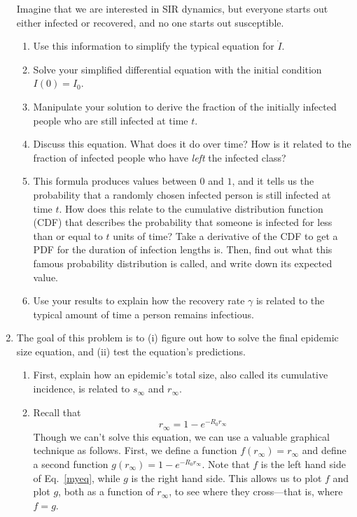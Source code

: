 \documentclass[11pt]{article}
\begin{document}
\begin{enumerate}
	Imagine that we are interested in SIR dynamics, but everyone starts out either infected or recovered, and no one starts out susceptible.
	\begin{enumerate}[label=\alph*.]
		\item Use this information to simplify the typical equation for $\dot{I}$.
		\item Solve your simplified differential equation with the initial condition $I(0) = I_0$.
		\item Manipulate your solution to derive the fraction of the initially infected people who are still infected at time $t$.
		\item Discuss this equation. What does it do over time? How is it related to the fraction of infected people who have {\it left} the infected class?
		\item This formula produces values between $0$ and $1$, and it tells us the probability that a randomly chosen infected person is still infected at time $t$. How does this relate to the cumulative distribution function (CDF) that describes the probability that someone is infected for less than or equal to $t$ units of time? Take a derivative of the CDF to get a PDF for the duration of infection lengths is. Then, find out what this famous probability distribution is called, and write down its expected value.
		\item Use your results to explain how the recovery rate $\gamma$ is related to the typical amount of time a person remains infectious.
	\end{enumerate}

\clearpage
\item The goal of this problem is to (i) figure out how to solve the final epidemic size equation, and (ii) test the equation's predictions.

	\begin{enumerate}[label=\alph*.]
		\item First, explain how an epidemic's total size, also called its cumulative incidence, is related to $s_\infty$ and $r_\infty$. 
		\item Recall that 
		\begin{equation}r_\infty = 1-e^{-R_0 r_\infty}\label{myeq}\end{equation} 
		Though we can't solve this equation, we can use a valuable graphical technique as follows. First, we define a function $f(r_\infty) = r_\infty$ and define a second function $g(r_\infty) = 1-e^{-R_0 r_\infty}$. Note that $f$ is the left hand side of Eq.~\eqref{myeq}, while $g$ is the right hand side. This allows us to plot $f$ and plot $g$, both as a function of $r_\infty$, to see where they cross---that is, where $f=g$. 
		

\end{enumerate}
\end{enumerate}
\end{document}
